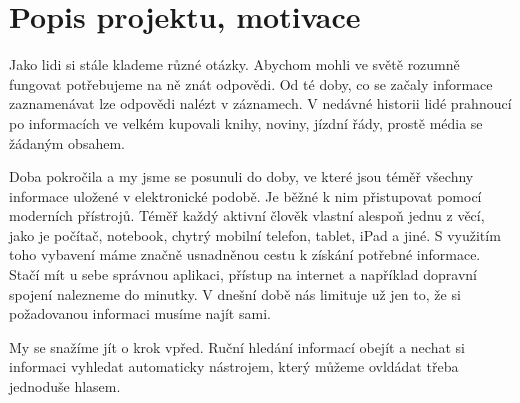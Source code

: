 \documentclass[12pt,a4paper]{article}
\begin{document}
\newpage
\pagestyle{plain}     %
\setcounter{page}{1}
\addtolength{\voffset}{-3cm}
\addtolength{\headheight}{2cm}

\pagestyle{fancy}
\lfoot{}
\cfoot{\thepage}
\rfoot{}
\renewcommand{\headrulewidth}{0.4pt}


\section*{Popis projektu, motivace}


Jako lidi si stále klademe různé otázky. Abychom mohli ve světě rozumně fungovat potřebujeme na ně znát odpovědi. Od té doby, co se začaly informace zaznamenávat lze odpovědi nalézt v záznamech. V nedávné historii lidé prahnoucí po informacích ve velkém kupovali knihy, noviny, jízdní řády, prostě média se žádaným obsahem. 

Doba pokročila a my jsme se posunuli do doby, ve které jsou téměř všechny informace uložené v elektronické podobě. Je běžné k nim přistupovat pomocí moderních přístrojů. Téměř každý aktivní člověk vlastní alespoň jednu z věcí, jako je počítač, notebook, chytrý mobilní telefon, tablet, iPad a jiné. S využitím toho vybavení máme značně usnadněnou cestu k získání potřebné informace. Stačí mít u sebe správnou aplikaci, přístup na internet a například dopravní spojení nalezneme do minutky. V dnešní době nás limituje už jen to, že si požadovanou informaci musíme najít sami.

My se snažíme jít o krok vpřed. Ruční hledání informací obejít a nechat si informaci vyhledat automaticky nástrojem, který můžeme ovldádat třeba jednoduše hlasem.
\end{document}

